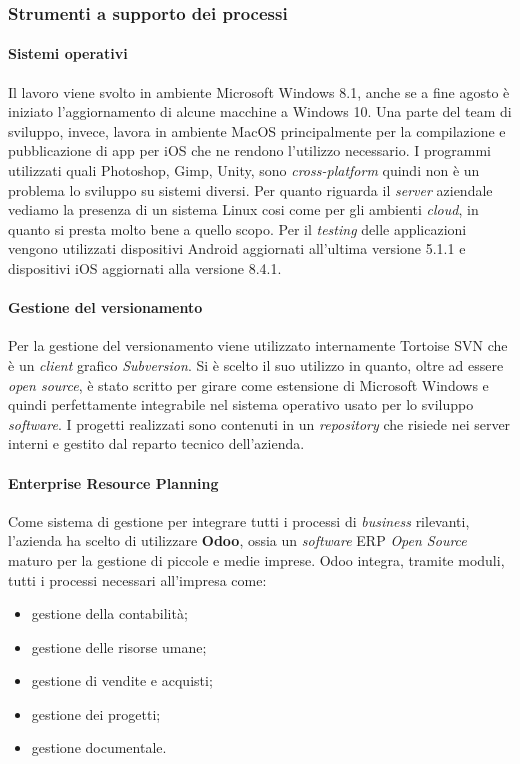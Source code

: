 \subsubsection{Strumenti a supporto dei processi}
\paragraph{Sistemi operativi}
Il lavoro viene svolto in ambiente Microsoft Windows 8.1, anche se a fine agosto \`e iniziato l'aggiornamento di alcune macchine a Windows 10. Una parte del team di sviluppo, invece, lavora in ambiente MacOS principalmente per la compilazione e pubblicazione di app per iOS che ne rendono l'utilizzo necessario. I programmi utilizzati quali Photoshop, Gimp, Unity, sono \textit{cross-platform\gloss} quindi non \`e un problema lo sviluppo su sistemi diversi. 
Per quanto riguarda il \textit{server} aziendale vediamo la presenza di un sistema Linux cosi come per gli ambienti \textit{cloud}, in quanto si presta molto bene a quello scopo.
Per il \textit{testing} delle applicazioni vengono utilizzati dispositivi Android aggiornati all'ultima versione 5.1.1 e dispositivi iOS aggiornati alla versione 8.4.1.

\paragraph{Gestione del versionamento}
Per la gestione del versionamento viene utilizzato internamente Tortoise SVN che \`e un \textit{client} grafico \textit{Subversion}. Si \`e scelto il suo utilizzo in quanto, oltre ad essere \textit{open source}, \`e stato scritto per girare come estensione di Microsoft Windows e quindi perfettamente integrabile nel sistema operativo usato per lo sviluppo \textit{software\gloss}.
I progetti realizzati sono contenuti in un \textit{repository} che risiede nei server interni e gestito dal reparto tecnico dell'azienda.

\paragraph{Enterprise Resource Planning}
Come sistema di gestione per integrare tutti i processi di \textit{business\gloss} rilevanti, l'azienda ha scelto di utilizzare \textbf{Odoo}, ossia un \textit{software\gloss} ERP \textit{Open Source} maturo per la gestione di piccole e medie imprese. 
Odoo integra, tramite moduli, tutti i processi necessari all'impresa come:
\begin{itemize}
	\item gestione della contabilità;
	\item gestione delle risorse umane;
	\item gestione di vendite e acquisti;
	\item gestione dei progetti;
	\item gestione documentale.
\end{itemize}

